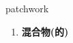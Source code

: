 
\begin{frame}
{\huge patchwork}
\begin{center}
\begin{enumerate}\Large
  \item \textbf{混合物(的)}
\end{enumerate}
\end{center}
\end{frame}
